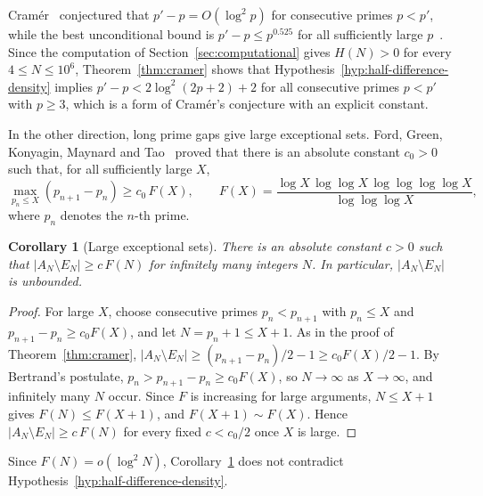 \documentclass[11pt]{amsart}
\newtheorem{Corollary}[Theorem]{Corollary}
\theoremstyle{definition}
\theoremstyle{remark}
\begin{document}
Cram\'er~\cite{cramer1936order} conjectured that $p'-p=O(\log^2 p)$ for consecutive primes $p<p'$, while the best unconditional bound is $p'-p\leq p^{0.525}$ for all sufficiently large $p$~\cite{baker2001difference}. Since the computation of Section~\ref{sec:computational} gives $H(N)>0$ for every $4\leq N\leq 10^6$, Theorem~\ref{thm:cramer} shows that Hypothesis~\ref{hyp:half-difference-density} implies $p'-p<2\log^2(2p+2)+2$ for all consecutive primes $p<p'$ with $p\geq 3$, which is a form of Cram\'er's conjecture with an explicit constant.

In the other direction, long prime gaps give large exceptional sets. Ford, Green, Konyagin, Maynard and Tao~\cite{ford2018long} proved that there is an absolute constant $c_0>0$ such that, for all sufficiently large $X$,
\[
\max_{p_n\leq X}(p_{n+1}-p_n)\geq c_0\,F(X),\qquad F(X)=\frac{\log X\,\log\log X\,\log\log\log\log X}{\log\log\log X},
\]
where $p_n$ denotes the $n$-th prime.
\begin{Corollary}[Large exceptional sets]\label{cor:long-gaps}
There is an absolute constant $c>0$ such that $|A_N\setminus E_N|\geq c\,F(N)$ for infinitely many integers $N$. In particular, $|A_N\setminus E_N|$ is unbounded.
\end{Corollary}
\begin{proof}
For large $X$, choose consecutive primes $p_n<p_{n+1}$ with $p_n\leq X$ and $p_{n+1}-p_n\geq c_0F(X)$, and let $N=p_n+1\leq X+1$. As in the proof of Theorem~\ref{thm:cramer}, $|A_N\setminus E_N|\geq (p_{n+1}-p_n)/2-1\geq c_0F(X)/2-1$. By Bertrand's postulate, $p_n>p_{n+1}-p_n\geq c_0F(X)$, so $N\to\infty$ as $X\to\infty$, and infinitely many $N$ occur. Since $F$ is increasing for large arguments, $N\leq X+1$ gives $F(N)\leq F(X+1)$, and $F(X+1)\sim F(X)$. Hence $|A_N\setminus E_N|\geq c\,F(N)$ for every fixed $c<c_0/2$ once $X$ is large.
\end{proof}
Since $F(N)=o(\log^2 N)$, Corollary~\ref{cor:long-gaps} does not contradict Hypothesis~\ref{hyp:half-difference-density}.
\end{document}
